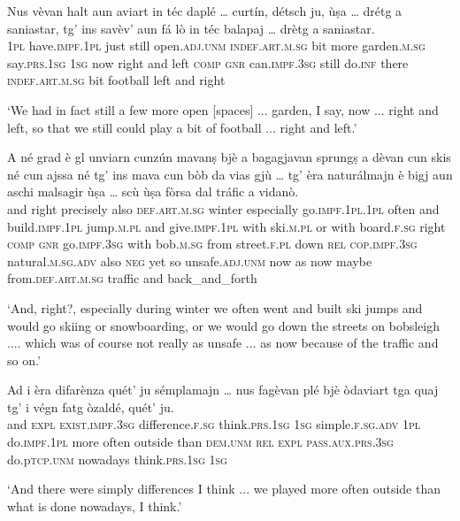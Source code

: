 \begin{linenumbers}
	\gll  Nus vèvan halt aun aviart in téc daplé … curtín, détsch ju, ùṣa … drétg a saniastar, tg’ ins savèv’ aun fá lò in téc balapaj … drètg a saniastar.  \\
	\textsc{1pl} have.\textsc{impf.1pl} just still open.\textsc{adj.unm} \textsc{indef.art.m.sg} bit more {} garden.\textsc{m.sg} say.\textsc{prs.1sg} \textsc{1sg} now {} right and left \textsc{comp} \textsc{gnr} can.\textsc{impf.3sg} still do.\textsc{inf} there \textsc{indef.art.m.sg} bit football {} left and right\\
\end{linenumbers}
\medskip
\glt `We had in fact still a few more open [spaces] ... garden, I say, now ... right and left, so that we still could play a bit of football ... right and left.'
\medskip

\begin{linenumbers}
	\gll A né grad è gl unviarn cunzún mavanṣ bjè a bagagjavan sprungṣ a dèvan cun skis né cun ajssa né tg’ ins mava cun bòb da vias gjù … tg’ èra naturálmajn è bigj aun aschi malsagir ùṣa … scù ùṣa fòrsa dal tráfic a vidanò.\\
	and right precisely also \textsc{def.art.m.sg} winter especially go.\textsc{impf.1pl.1pl} often and build.\textsc{impf.1pl} jump.\textsc{m.pl} and give.\textsc{impf.1pl} with ski.\textsc{m.pl} or with board.\textsc{f.sg} right \textsc{comp} \textsc{gnr} go.\textsc{impf.3sg} with bob.\textsc{m.sg} from street.\textsc{f.pl} down {} \textsc{rel} \textsc{cop.impf.3sg} natural.\textsc{m.sg.adv} also \textsc{neg} yet so unsafe.\textsc{adj.unm} now {} as now maybe from.\textsc{def.art.m.sg} traffic and back\_and\_forth\\
\end{linenumbers}   
\medskip
\glt `And, right?, especially during winter we often went and built ski jumps and would go skiing or snowboarding, or we would go down the streets on bobsleigh .... which was of course not really as unsafe ... as now because of the traffic and so on.'
\medskip

\begin{linenumbers}
	\gll Ad i èra difarènza quét’ ju sémplamajn … nus fagèvan plé bjè òdaviart tga quaj tg’ i végn fatg òzaldé, quét’ ju.   \\
	and \textsc{expl} \textsc{exist.impf.3sg} difference.\textsc{f.sg} think.\textsc{prs.1sg} \textsc{1sg} simple.\textsc{f.sg.adv} {} \textsc{1pl} do.\textsc{impf.1pl} more often outside than \textsc{dem.unm} \textsc{rel} \textsc{expl} \textsc{pass.aux.prs.3sg} do.p\textsc{tcp.unm} nowadays think.\textsc{prs.1sg} \textsc{1sg}\\
\end{linenumbers}
\medskip
\glt `And there were simply differences I think ... we played more often outside than what is done nowadays, I think.'
\medskip

